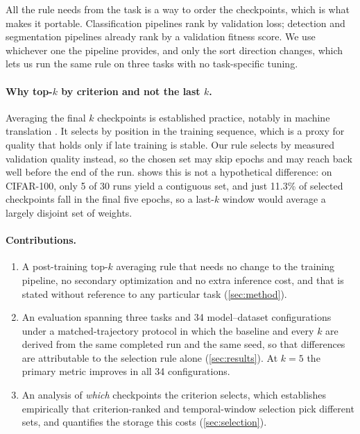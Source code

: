 All the rule needs from the task is a way to order the checkpoints, which is
what makes it portable. Classification pipelines rank by validation loss;
detection and segmentation pipelines already rank by a validation fitness
score. We use whichever one the pipeline provides, and only the sort direction
changes, which lets us run the same rule on three tasks with no task-specific
tuning.

\paragraph{Why top-$k$ by criterion and not the last $k$.}
Averaging the final $k$ checkpoints is established practice, notably in machine
translation \cite{vaswani2017attention,junczys2016neural}. It selects by
position in the training sequence, which is a proxy for quality that holds only
if late training is stable. Our rule selects by measured validation quality
instead, so the chosen set may skip epochs and may reach back well before the
end of the run.  shows this is not a hypothetical
difference: on CIFAR-100, only 5 of 30 runs yield a contiguous set, and just
11.3\% of selected checkpoints fall in the final five epochs, so a last-$k$
window would average a largely disjoint set of weights.

\paragraph{Contributions.}
\begin{enumerate}
\itemsep0em
\item A post-training top-$k$ averaging rule that needs no change to the
training pipeline, no secondary optimization and no extra inference cost, and
that is stated without reference to any particular task (\cref{sec:method}).
\item An evaluation spanning three tasks and 34 model--dataset configurations
under a matched-trajectory protocol in which the baseline and every $k$ are
derived from the same completed run and the same seed, so that differences are
attributable to the selection rule alone (\cref{sec:results}). At $k{=}5$ the
primary metric improves in all 34 configurations.
\item An analysis of \emph{which} checkpoints the criterion selects, which
establishes empirically that criterion-ranked and temporal-window selection
pick different sets, and quantifies the storage this costs
(\cref{sec:selection}).
\end{enumerate}
